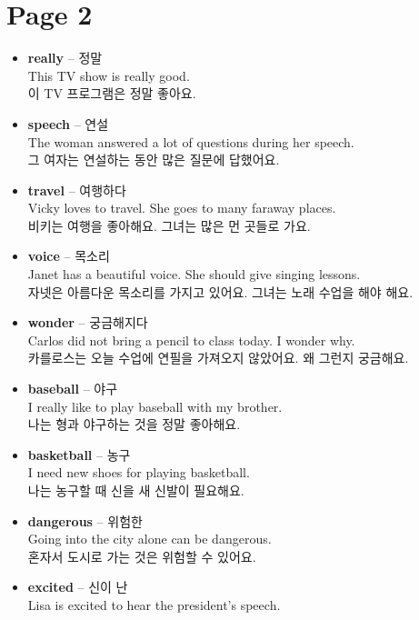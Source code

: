 \documentclass[12pt]{article}
\begin{document}
\section*{Page 2}
\begin{itemize}
    \item \textbf{really} -- 정말 \\
    This TV show is really good. \\
    이 TV 프로그램은 정말 좋아요.
    \item \textbf{speech} -- 연설 \\
    The woman answered a lot of questions during her speech. \\
    그 여자는 연설하는 동안 많은 질문에 답했어요.
    \item \textbf{travel} -- 여행하다 \\
    Vicky loves to travel. She goes to many faraway places. \\
    비키는 여행을 좋아해요. 그녀는 많은 먼 곳들로 가요.
    \item \textbf{voice} -- 목소리 \\
    Janet has a beautiful voice. She should give singing lessons. \\
    자넷은 아름다운 목소리를 가지고 있어요. 그녀는 노래 수업을 해야 해요.
    \item \textbf{wonder} -- 궁금해지다 \\
    Carlos did not bring a pencil to class today. I wonder why. \\
    카를로스는 오늘 수업에 연필을 가져오지 않았어요. 왜 그런지 궁금해요.
    \item \textbf{baseball} -- 야구 \\
    I really like to play baseball with my brother. \\
    나는 형과 야구하는 것을 정말 좋아해요.
    \item \textbf{basketball} -- 농구 \\
    I need new shoes for playing basketball. \\
    나는 농구할 때 신을 새 신발이 필요해요.
    \item \textbf{dangerous} -- 위험한 \\
    Going into the city alone can be dangerous. \\
    혼자서 도시로 가는 것은 위험할 수 있어요.
    \item \textbf{excited} -- 신이 난 \\
    Lisa is excited to hear the president's speech. \\

\end{itemize}
\end{document}
